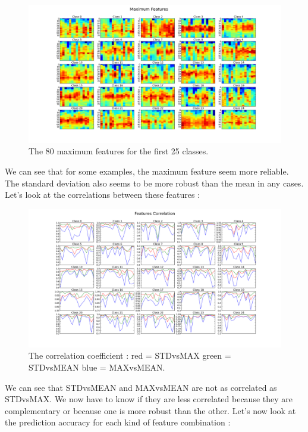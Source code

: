 \documentclass[a4paper]{report}
\begin{document}
\begin{figure}[H]
\begin{center}
\includegraphics[scale=0.25]{maximum_S0.png}\caption{The 80 maximum features for the first 25 classes.}\label{maxfeatures}
\end{center}
\end{figure}
We can see that for some examples, the maximum feature seem more reliable. The standard deviation also seems to be more robust than the mean in any cases.
Let's look at the correlations between these features :
\begin{figure}[H]
\begin{center}
\includegraphics[scale=0.25]{corr_S0.png}\caption{The correlation coefficient : red = STDvsMAX green = STDvsMEAN blue = MAXvsMEAN.}\label{featurescorrelation}
\end{center}
\end{figure}
We can see that STDvsMEAN and MAXvsMEAN are not as correlated as STDvsMAX. We now have to know if they are less correlated because they are complementary or because one is more robust than the other.
Let's now look at the prediction accuracy for each kind of feature combination :
\end{document}
